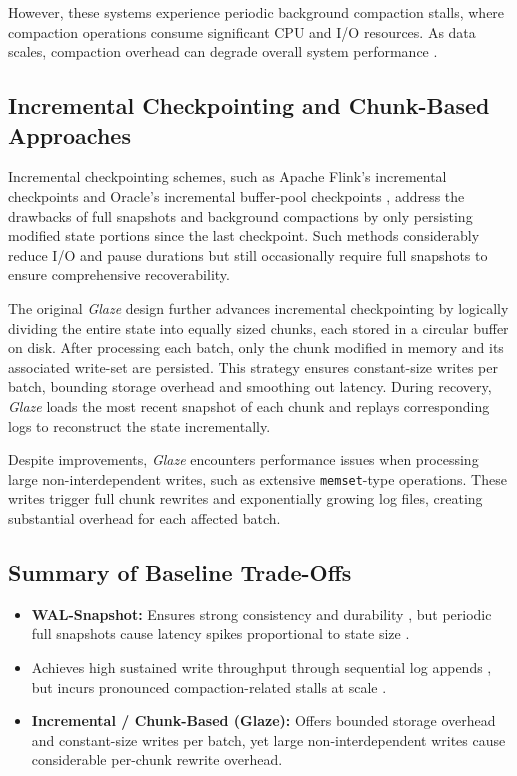 \documentclass[conference]{IEEEtran}
\begin{document}
However, these systems experience periodic background compaction stalls, where compaction operations consume significant CPU and I/O resources. As data scales, compaction overhead can degrade overall system performance \cite{o1996lsm,ongaro2020efficient}.

\subsection{Incremental Checkpointing and Chunk-Based Approaches}

Incremental checkpointing schemes, such as Apache Flink’s incremental checkpoints \cite{carbone2015flink} and Oracle’s incremental buffer-pool checkpoints \cite{kalantar1998oracle}, address the drawbacks of full snapshots and background compactions by only persisting modified state portions since the last checkpoint. Such methods considerably reduce I/O and pause durations but still occasionally require full snapshots to ensure comprehensive recoverability.

The original \textit{Glaze} design further advances incremental checkpointing by logically dividing the entire state into equally sized chunks, each stored in a circular buffer on disk. After processing each batch, only the chunk modified in memory and its associated write-set are persisted. This strategy ensures constant-size writes per batch, bounding storage overhead and smoothing out latency. During recovery, \textit{Glaze} loads the most recent snapshot of each chunk and replays corresponding logs to reconstruct the state incrementally.

Despite improvements, \textit{Glaze} encounters performance issues when processing large non-interdependent writes, such as extensive \texttt{memset}-type operations. These writes trigger full chunk rewrites and exponentially growing log files, creating substantial overhead for each affected batch.

\subsection{Summary of Baseline Trade-Offs}

\begin{itemize}
\item \textbf{WAL-Snapshot:} Ensures strong consistency and durability \cite{mohan1992aries}, but periodic full snapshots cause latency spikes proportional to state size \cite{kalantar1998oracle}.
\item \cite{ono1996lsm} Achieves high sustained write throughput through sequential log appends \cite{rosenblum1992lfs}, but incurs pronounced compaction-related stalls at scale \cite{ono1996lsm}.
\item \textbf{Incremental / Chunk-Based (Glaze):} Offers bounded storage overhead and constant-size writes per batch, yet large non-interdependent writes cause considerable per-chunk rewrite overhead.
\end{itemize}
\end{document}
